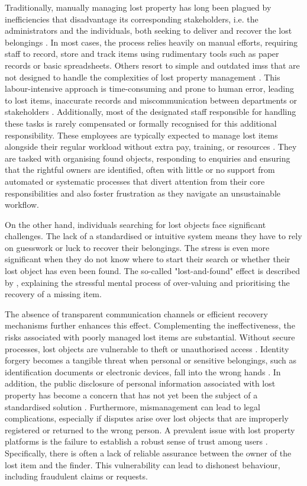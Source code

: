Traditionally, manually managing lost property has long been plagued by inefficiencies that disadvantage its corresponding stakeholders, i.e. the administrators and the individuals, both seeking to deliver and recover the lost belongings \cite{Sinha2024}. In most cases, the process relies heavily on manual efforts, requiring staff to record, store and track items using rudimentary tools such as paper records or basic spreadsheets. Others resort to simple and outdated \acp{ims} that are not designed to handle the complexities of lost property management \cite{Guinard2008}. This labour-intensive approach is time-consuming and prone to human error, leading to lost items, inaccurate records and miscommunication between departments or stakeholders \cite{Sinha2024, Guinard2008}. Additionally, most of the designated staff responsible for handling these tasks is rarely compensated or formally recognised for this additional responsibility. These employees are typically expected to manage lost items alongside their regular workload without extra pay, training, or resources \cite{Guinard2008}. They are tasked with organising found objects, responding to enquiries and ensuring that the rightful owners are identified, often with little or no support from automated or systematic processes that divert attention from their core responsibilities and also foster frustration as they navigate an unsustainable workflow.

On the other hand, individuals searching for lost objects face significant challenges. The lack of a standardised or intuitive system means they have to rely on guesswork or luck to recover their belongings. The stress is even more significant when they do not know where to start their search or whether their lost object has even been found. The so-called "lost-and-found" effect is described by , explaining the stressful mental process of over-valuing and prioritising the recovery of a missing item.

The absence of transparent communication channels \cite{Guinard2008} or efficient recovery mechanisms further enhances this effect. Complementing the ineffectiveness, the risks associated with poorly managed lost items are substantial. Without secure processes, lost objects are vulnerable to theft or unauthorised access \cite{Tan2023}. Identity forgery becomes a tangible threat when personal or sensitive belongings, such as identification documents or electronic devices, fall into the wrong hands \cite{Xue2022}. In addition, the public disclosure of personal information associated with lost property has become a concern that has not yet been the subject of a standardised solution \cite{Xue2022}. Furthermore, mismanagement can lead to legal complications, especially if disputes arise over lost objects that are improperly registered or returned to the wrong person. A prevalent issue with lost property platforms is the failure to establish a robust sense of trust among users \cite{Xue2022}. Specifically, there is often a lack of reliable assurance between the owner of the lost item and the finder. This vulnerability can lead to dishonest behaviour, including fraudulent claims or requests.

